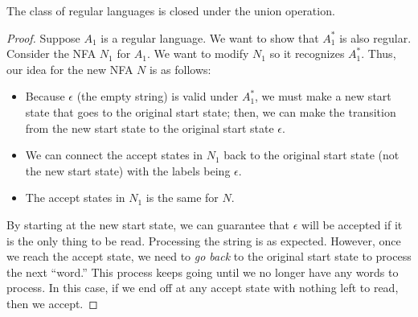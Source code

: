 \documentclass[letterpaper]{article}
\begin{document}
\begin{theorem}{}{}
    The class of regular languages is closed under the union operation.
\end{theorem}

\begin{mdframed}[]
    \begin{proof}
        Suppose $A_1$ is a regular language. We want to show that $A_1^*$ is also regular. Consider the NFA $N_1$ for $A_1$. We want to modify $N_1$ so it recognizes $A_1^*$. Thus, our idea for the new NFA $N$ is as follows: 
        \begin{itemize}
            \item Because $\epsilon$ (the empty string) is valid under $A_1^*$, we must make a new start state that goes to the original start state; then, we can make the transition from the new start state to the original start state $\epsilon$. 
            \item We can connect the accept states in $N_1$ back to the original start state (not the new start state) with the labels being $\epsilon$.
            \item The accept states in $N_1$ is the same for $N$. 
        \end{itemize}
        By starting at the new start state, we can guarantee that $\epsilon$ will be accepted if it is the only thing to be read. Processing the string is as expected. However, once we reach the accept state, we need to \emph{go back} to the original start state to process the next ``word.'' This process keeps going until we no longer have any words to process. In this case, if we end off at any accept state with nothing left to read, then we accept. 
    \end{proof}
\end{mdframed}
\end{document}
